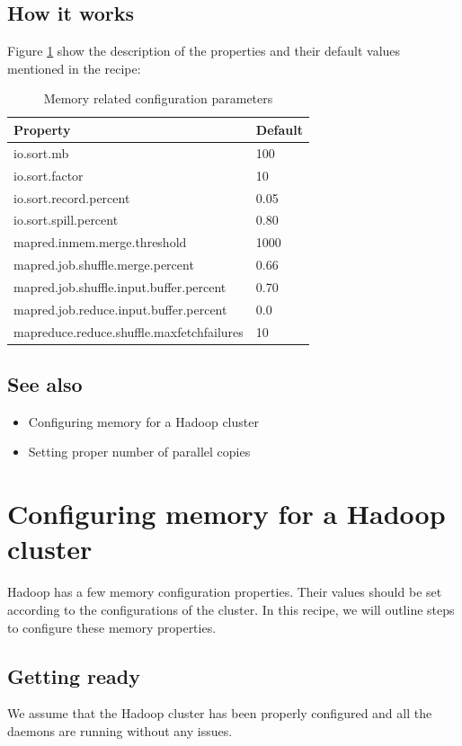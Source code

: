 \subsection*{How it works}
 Figure \ref{tbl:memoryconfig} show the description of the properties and their default values mentioned in the recipe:
\begin{table}[ht]
  \centering
  \begin{tabular}{ll}
    \toprule
    \textbf{Property} &  \textbf{Default} \\ \midrule
      io.sort.mb & 100 \\
      io.sort.factor & 10 \\
      io.sort.record.percent & 0.05 \\
      io.sort.spill.percent & 0.80 \\
      mapred.inmem.merge.threshold & 1000 \\
      mapred.job.shuffle.merge.percent & 0.66 \\
      mapred.job.shuffle.input.buffer.percent & 0.70 \\
      mapred.job.reduce.input.buffer.percent & 0.0 \\
      mapreduce.reduce.shuffle.maxfetchfailures & 10  \\ \bottomrule
  \end{tabular}
  \caption{Memory related configuration parameters}\label{tbl:memoryconfig}
\end{table}

\subsection*{See also}
\begin{itemize}
  \item Configuring memory for a Hadoop cluster
  \item Setting proper number of parallel copies
\end{itemize}
\section{Configuring memory for a Hadoop cluster}
Hadoop has a few memory configuration properties. Their values should be set according to the configurations of the cluster. In this recipe, we will outline steps to configure these memory properties.
\subsection*{Getting ready}
We assume that the Hadoop cluster has been properly configured and all the daemons are running without any issues.

